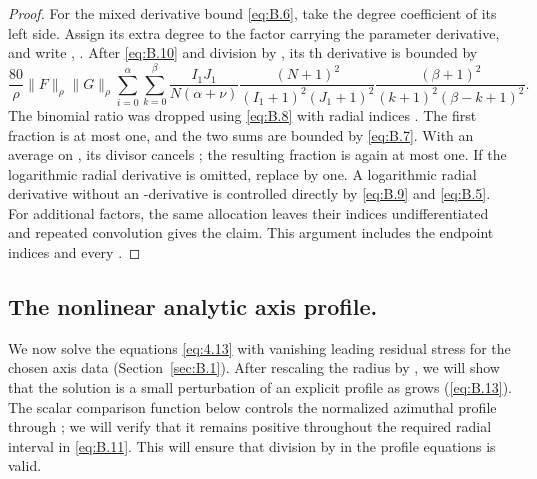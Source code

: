 \begin{proof}
For the mixed derivative bound \eqref{eq:B.6}, take the degree
 coefficient of its left side. Assign its extra degree to the factor
carrying the parameter derivative, and write ,
. After \eqref{eq:B.10} and division by
, its th derivative is bounded by
\begin{equation*}
  \frac{80}{\rho}\lVert F\rVert_\rho\lVert G\rVert_\rho
  \sum_{i=0}^{\alpha}\sum_{k=0}^{\beta}
  \frac{I_1J_1}{N(\alpha+\nu)}
  \frac{(N+1)^2}{(I_1+1)^2(J_1+1)^2}
  \frac{(\beta+1)^2}{(k+1)^2(\beta-k+1)^2}.
\end{equation*}
The binomial ratio was dropped using \eqref{eq:B.8} with radial indices
. The first fraction is at most one, and the two sums are bounded by
\eqref{eq:B.7}. With an average on , its divisor
 cancels ; the resulting fraction is again at
most one. If the logarithmic radial derivative is omitted, replace
 by one. A logarithmic radial derivative without an
-derivative is controlled directly by \eqref{eq:B.9} and
\eqref{eq:B.5}. For additional factors, the same allocation leaves their indices undifferentiated
and repeated convolution gives the claim. This argument includes the endpoint indices and every
.
\end{proof}

\subsection{The nonlinear analytic axis profile.}\label{sec:B.3}
We now solve the equations \eqref{eq:4.13} with vanishing leading residual stress for the chosen
axis data (Section~\ref{sec:B.1}). After rescaling the radius by
, we will show that the solution is a small perturbation of an
explicit profile as  grows (\eqref{eq:B.13}). The scalar comparison
function  below controls the normalized azimuthal profile
 through ; we will verify that it
remains positive throughout the required radial interval in \eqref{eq:B.11}. This will ensure that
division by  in the profile equations is valid.

